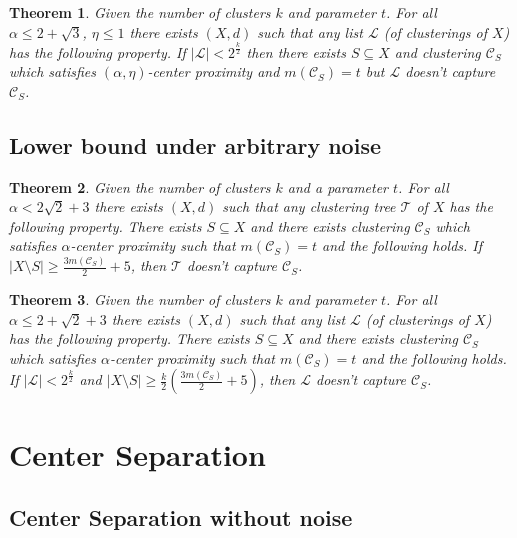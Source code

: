 \documentclass[12pt]{article}
\newtheorem{theorem}{Theorem}
\newcommand{\mc}{\mathcal}
\begin{document}
\begin{theorem}
\label{thm:nolistalphacp}
Given the number of clusters $k$ and parameter $t$. For all $\alpha \le 2+\sqrt{3}$, $\eta \le 1$ there exists $(X, d)$ such that any list $\mc L$ (of clusterings of $X$) has  the following property. If $|\mc L| < 2^{\frac{k}{2}}$ then there exists $S \subseteq X$ and clustering $\mc C_{S}$ which satisfies $(\alpha, \eta)$-center proximity and $ m(\mc C_{S}) = t$ but $\mc L$ doesn't capture $\mc C_{S}$.
\end{theorem}

\subsection{Lower bound under arbitrary noise}
\label{section:alphaLowerBoundArbitrary}

\begin{theorem}
\label{thm:nosparsealg}
Given the number of clusters $k$ and a parameter $t$. For all $\alpha < 2\sqrt 2 + 3$ there exists $(X, d)$ such that any clustering tree $\mc T$ of $X$ has the following property. There exists $S \subseteq X$ and there exists clustering $\mc C_{S}$ which satisfies $\alpha$-center proximity such that $m(\mc C_{S}) = t$ and the following holds. If $|X \setminus S| \ge \frac{3m(\mc C_{S})}{2}+5$, then $\mc T$ doesn't capture $\mc C_{S}$.
\end{theorem}

\begin{theorem}
\label{thm:nosparselistalphacp}
Given the number of clusters $k$ and parameter $t$. For all $\alpha \le 2+\sqrt{2}+3$ there exists $(X, d)$ such that any list $\mc L$ (of clusterings of $X$) has  the following property. There exists $S \subseteq X$ and there exists clustering $\mc C_{S}$ which satisfies $\alpha$-center proximity such that $m(\mc C_{S}) = t$ and the following holds. If $|\mc L| < 2^{\frac{k}{2}}$ and $|X \setminus S|\ge \frac{k}{2}(\frac{3m(\mc C_{S})}{2}+5)$, then $\mc L$ doesn't capture $\mc C_{S}$.
\end{theorem}

\section{Center Separation}
\label{sec:cs}
 
\subsection{Center Separation without noise}
\label{sec:cswithout}
\end{document}
